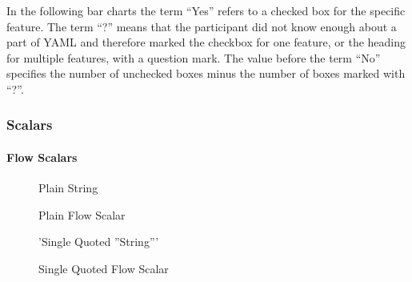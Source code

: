 In the following bar charts the term “Yes” refers to a checked box for the specific feature. The term “?” means that the participant did not know enough about a part of YAML and therefore marked the checkbox for one feature, or the heading for multiple features, with a question mark. The value before the term “No” specifies the number of unchecked boxes minus the number of boxes marked with “?”.

\subsubsection{Scalars}

\paragraph{Flow Scalars}

\begin{figure}[H]
  \begin{minipage}[t]{0.48\textwidth}
    \vspace{0pt}
    \begin{bchart}[max=9, width=0.85\textwidth]
    \end{bchart}
  \end{minipage}
  \begin{minipage}[t]{0.48\textwidth}
    \vspace{0pt}
    \begin{yamlcode}
      Plain String
    \end{yamlcode}
  \end{minipage}
  \caption{Plain Flow Scalar}
\end{figure}

\begin{figure}[H]
  \begin{minipage}[t]{0.48\textwidth}
    \vspace{0pt}
    \begin{bchart}[max=9, width=0.85\textwidth]
    \end{bchart}
  \end{minipage}
  \begin{minipage}[t]{0.48\textwidth}
    \vspace{0pt}
    \begin{yamlcode}
      'Single Quoted ''String'''
    \end{yamlcode}
  \end{minipage}
  \caption{Single Quoted Flow Scalar}
\end{figure}

